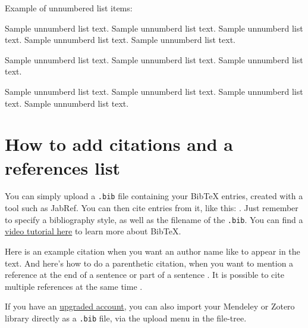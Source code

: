 \documentclass[12pt,a4paper]{article}
\newenvironment{unlist}{%
  \begin{list}{}{%
    \setlength{\labelwidth}{0pt}%
    \setlength{\labelsep}{0pt}%
    \setlength{\leftmargin}{2em}%
    \setlength{\itemindent}{-2em}%
    \setlength{\topsep}{\medskipamount}%
    \setlength{\itemsep}{3pt}%
  }%
}{%
  \end{list}%
}
\begin{document}
\noindent
Example of unnumbered list items:

\begin{unlist}
\item Sample unnumberd list text. Sample unnumberd list text. Sample unnumberd list text. Sample unnumberd list text. Sample unnumberd list text.

\item Sample unnumberd list text. Sample unnumberd list text. Sample unnumberd list text.

\item Sample unnumberd list text. Sample unnumberd list text. Sample unnumberd list text. Sample unnumberd list text. 
\end{unlist}


\section{How to add citations and a references list}

You can simply upload a \verb|.bib| file containing your BibTeX entries, created with a tool such as JabRef. You can then cite entries from it, like this: \textcite{greenwade93}. Just remember to specify a bibliography style, as well as the filename of the \verb|.bib|. You can find a \href{https://www.overleaf.com/help/97-how-to-include-a-bibliography-using-bibtex}{video tutorial here} to learn more about BibTeX.

Here is an example citation when you want an author name like \textcite{collins2011a} to appear in the text. And here's how to do a parenthetic citation, when you want to mention a reference at the end of a sentence or part of a sentence \parencite{collins2013}. It is possible to cite multiple references at the same time \parencite{collins2011b,collins2016,lunn2007a,lunn2007b,ross2006,shannon1948}.

If you have an \href{https://www.overleaf.com/user/subscription/plans}{upgraded account}, you can also import your Mendeley or Zotero library directly as a \verb|.bib| file, via the upload menu in the file-tree.
\end{document}
